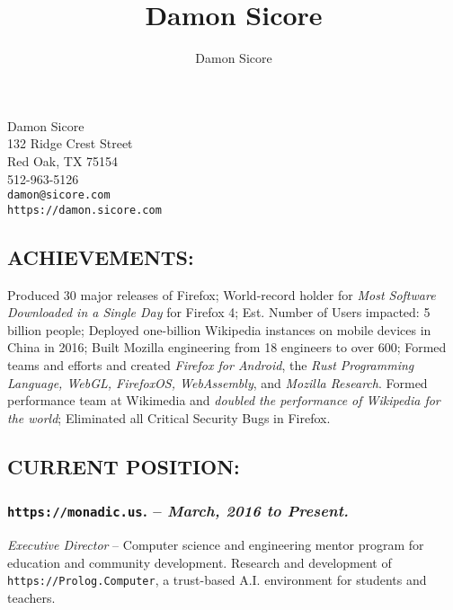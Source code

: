 \documentclass[10pt]{report}
\author{Damon Sicore}
\title{Damon Sicore}
\begin{document}
\begin{center}
\LARGE Damon Sicore \\
\normalsize
132 Ridge Crest Street \\
Red Oak, TX 75154 \\
512-963-5126\\
\texttt{damon@sicore.com}\\
\texttt{https://damon.sicore.com}\\
\end{center}

\subsection*{ACHIEVEMENTS:}  Produced 30 major releases of Firefox; World-record
holder for \emph{Most Software Downloaded in a Single Day} for Firefox 4; Est.
Number of Users impacted: 5 billion people;  Deployed one-billion Wikipedia
instances on mobile devices in China in 2016; Built Mozilla engineering from 18
engineers to over 600;  Formed teams and efforts and created \emph{Firefox for
Android}, the \emph{Rust Programming Language, WebGL, FirefoxOS, WebAssembly},
and \emph{Mozilla Research}.  Formed performance team at Wikimedia and
\emph{doubled the performance of Wikipedia for the world}; Eliminated all
Critical Security Bugs in Firefox.

\subsection*{CURRENT POSITION:}

\subsubsection*{\texttt{https://monadic.us}. -- \emph{March, 2016 to Present. }}
\emph{Executive Director} -- Computer science and engineering mentor program for
education and community development.  Research and development of
\texttt{https://Prolog.Computer}, a trust-based A.I. environment for students
and teachers.
\end{document}
